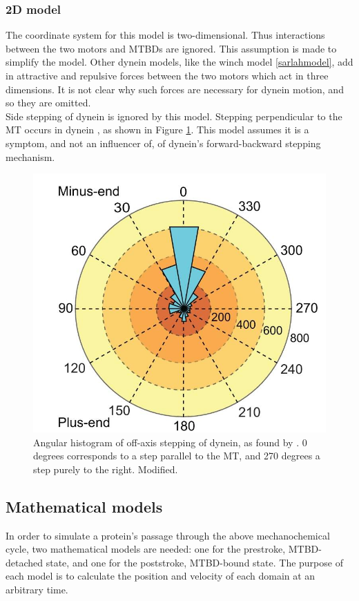 \documentclass[10pt]{article} %
\begin{document}
\subsubsection{2D model}
The coordinate system for this model is two-dimensional. Thus interactions between the two motors and MTBDs are ignored. This assumption is made to simplify the model. Other dynein models, like the winch model \ref{sarlahmodel}, add in attractive and repulsive forces between the two motors which act in three dimensions. It is not clear why such forces are necessary for dynein motion, and so they are omitted.\\

Side stepping of dynein is ignored by this model. Stepping perpendicular to the MT occurs in dynein \cite{weihongppaer}, as shown in Figure \ref{fig:weihong-side-stepping}. This model assumes it is a symptom, and not an influencer of, of dynein's forward-backward stepping mechanism.

\begin{figure}[h]
  \centering
  \includegraphics[width=.45\textwidth]{../../figures/weihong-side-stepping}
  \caption{Angular histogram of off-axis stepping of dynein, as found by \cite{weihongpaper}. 0 degrees corresponds to a step parallel to the MT, and 270 degrees a step purely to the right. Modified.}
  \label{fig:weihong-side-stepping}
\end{figure}

\subsection{Mathematical models}
In order to simulate a protein's passage through the above mechanochemical cycle, two mathematical models are needed: one for the prestroke, MTBD-detached state, and one for the poststroke, MTBD-bound state. The purpose of each model is to calculate the position and velocity of each domain at an arbitrary time.\\
\end{document}
